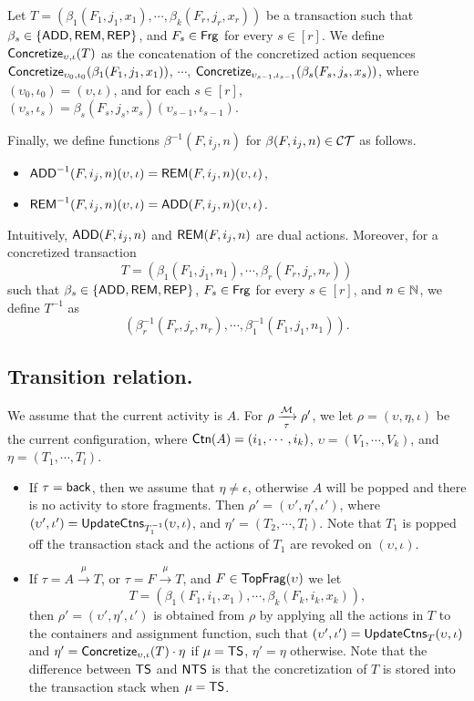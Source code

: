 Let $T = (\beta_1(F_1, j_1, x_1), \cdots, \beta_k(F_r, j_r, x_r))$ be a transaction such that $\beta_s \in \{\mathsf{ADD},\mathsf{REM}, \mathsf{REP}\}$, and $F_s \in {\sf Frg}$ for every $s \in [r]$.
We define $\mathsf{Concretize}_{\upsilon, \iota}(T)$ as the concatenation of the concretized action sequences 
$ \mathsf{Concretize}_{\upsilon_0, \iota_0}(\beta_1(F_1, j_1, x_1))$, $\cdots$, $\mathsf{Concretize}_{\upsilon_{s-1}, \iota_{s-1}}(\beta_s(F_s, j_s, x_s))$,
where $(\upsilon_0, \iota_0)= (\upsilon, \iota)$, and for each $s \in [r]$, $(\upsilon_s, \iota_s) = \beta_s(F_s, j_s, x_s)(\upsilon_{s-1}, \iota_{s-1})$.

Finally, we define functions $\beta^{-1}(F, i_j, n)$ for $\beta(F, i_j, n) \in \mathcal{CT}$ as follows.
\begin{itemize}
 \item $\mathsf{ADD}^{-1}(F, i_j, n)(\upsilon, \iota) =\mathsf{REM}(F, i_j, n)(\upsilon, \iota)$,
 \item $\mathsf{REM}^{-1}(F, i_j, n)(\upsilon, \iota) = \mathsf{ADD}(F, i_j, n)(\upsilon, \iota)$.
\end{itemize}
Intuitively, $\mathsf{ADD}(F, i_j, n)$ and $\mathsf{REM}(F, i_j, n)$ are dual actions.
%
Moreover, for a concretized transaction 
$$T = (\beta_1(F_1, j_1, n_1), \cdots, \beta_{r}(F_r, j_r, n_r))$$ 
such that $\beta_s \in \{\mathsf{ADD},\mathsf{REM},\mathsf{REP}\}$, $F_s \in {\sf Frg}$ for every $s \in [r]$, and $n \in {\mathbb{N} }$, we define $T^{-1}$ as 
$$(\beta^{-1}_{r}(F_r, j_r, n_r), \cdots, \beta^{-1}_1(F_1, j_1, n_1)).$$



\subsection*{Transition relation.} 
We assume that the current activity is $A$. For $\rho\xrightarrow[\tau]{{\mathcal{M} }}\rho'$, we let $\rho = (\upsilon,\eta,\iota)$ be the current configuration, where
${\sf Ctn}(A) = (i_1, \cdots, i_k)$, 
$\upsilon = (V_1, \cdots, V_k)$, and $\eta = (T_1, \cdots, T_l)$.
\begin{itemize}
    \item If $\tau = {\mathsf{back} }$, then we assume that $\eta\neq\epsilon$, otherwise $A$ will be popped and there is no activity to store fragments. Then $\rho' = (\upsilon',\eta',\iota')$, where $(\upsilon', \iota') = \mathsf{UpdateCtns}_{T_1^{-1}}(\upsilon, \iota)$, and $\eta' = (T_2, \cdots, T_l)$.  Note that $T_1$ is popped off the transaction stack and the actions of $T_1$ are revoked on $(\upsilon, \iota)$.
    \item If $\tau = A\xrightarrow{\mu}T$, or $\tau = F\xrightarrow{\mu}T$, and $F\in\mathsf{TopFrag}(\upsilon)$
    we let 
    $$T = (\beta_1(F_1, i_1, x_1), \cdots, \beta_k(F_k, i_k, x_k)),$$ then $\rho' = (\upsilon',\eta',\iota')$ is obtained from $\rho$ by applying all the actions in $T$ to the containers and assignment function, such that $(\upsilon', \iota') = \mathsf{UpdateCtns}_{T}(\upsilon, \iota)$ and $\eta' = \mathsf{Concretize}_{\upsilon, \iota}(T) \cdot \eta$ if $\mu = {\sf TS}$, $\eta' = \eta$ otherwise.
    Note that the difference between ${\sf TS}$ and ${\sf NTS}$ is that the concretization of $T$ is stored into the transaction stack when $\mu={\sf TS}$.
\end{itemize}

